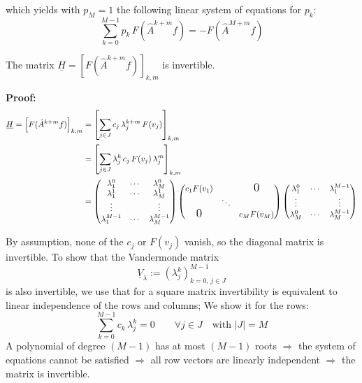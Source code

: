 which yields with $p_M = 1$ the following linear system of equations for $p_k$:
\begin{equation*}
    \sum_{k=0}^{M-1} p_k\, F(\hat{A}^{k+m} f) = -F(\hat{A}^{M+m} f)
\end{equation*}

The matrix $\underline{H} = \left[ F(\hat{A}^{k+m} f) \right]_{k,m}$ is invertible.

\textbf{Proof:}
\begin{align*}
    \underline{H} = \left[ F(\hat{A}^{k+m} f) \right]_{k,m} &= \left[ \sum_{j \in J} c_j\, \lambda_j^{k+m}\, F(v_j) \right]_{k,m} \\
    &= \left[ \sum_{j \in J} \lambda_j^{k}\, c_j\, F(v_j)\, \lambda_j^{m} \right]_{k,m} \\
    &= \begin{pmatrix} \lambda_1^0 & \cdots & \lambda_M^0 \\ \lambda_1^1 & \cdots & \lambda_M^1 \\ \vdots & & \vdots \\ \lambda_1^{M-1} & \cdots & \lambda_M^{M-1} \end{pmatrix}
    \begin{pmatrix} c_1 F(v_1) & & \text{\Large 0} \\ & \ddots & \\ \text{\Large 0} & & c_M F(v_M) \end{pmatrix}
    \begin{pmatrix} \lambda_1^0 & \cdots & \lambda_1^{M-1} \\ \vdots & & \vdots \\ \lambda_M^0 & \cdots & \lambda_M^{M-1} \end{pmatrix}
\end{align*}

By assumption, none of the $c_j$ or $F(v_j)$ vanish, so the diagonal matrix is invertible. To show that the Vandermonde matrix
\begin{equation*}
    \underline{V}_{\lambda} := \left( \lambda_j^{k} \right)_{k=0,\, j \in J}^{M-1}
\end{equation*}
is also invertible, we use that for a square matrix invertibility is equivalent to linear independence of the rows and columns; We show it for the rows:
\begin{equation*}
    \sum_{k=0}^{M-1} c_k\, \lambda_j^{k} = 0 \qquad \forall j \in J \quad \text{with } |J| = M
\end{equation*}
A polynomial of degree $(M-1)$ has at most $(M-1)$ roots $\Rightarrow$ the system of equations cannot be satisfied $\Rightarrow$ all row vectors are linearly independent $\Rightarrow$ the matrix is invertible.

